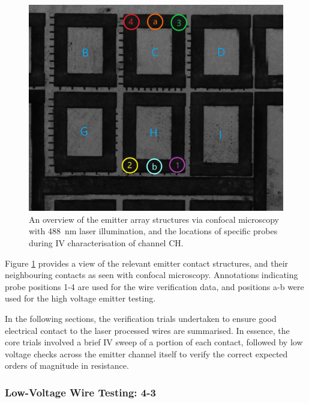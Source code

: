 \begin{refsection}
\begin{figure}[H]
    \centering
    \includegraphics[width=\linewidth]{Chapter7/Figs/Raster/emitter_probes_esid.jpg}
    \caption{An overview of the emitter array structures via confocal microscopy with 488~\si{\nano\metre} laser illumination, and the locations of specific probes during IV characterisation of channel CH.}
    \label{fig:emitter_esid_anno}
\end{figure}

Figure \ref{fig:emitter_esid_anno} provides a view of the relevant emitter contact structures, and their neighbouring contacts as seen with confocal microscopy. Annotations indicating probe positions 1-4 are used for the wire verification data, and positions a-b were used for the high voltage emitter testing.

In the following sections, the verification trials undertaken to ensure good electrical contact to the laser processed wires are summarised. In essence, the core trials involved a brief IV sweep of a portion of each contact, followed by low voltage checks across the emitter channel itself to verify the correct expected orders of magnitude in resistance. 

\subsubsection{Low-Voltage Wire Testing: 4-3}


\end{refsection}
